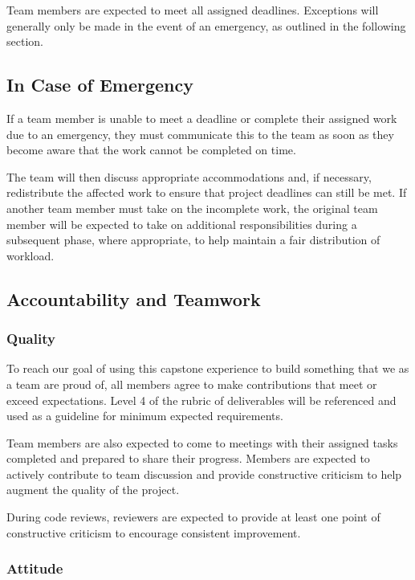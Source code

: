 \documentclass{article}
\begin{document}
Team members are expected to meet all assigned deadlines. Exceptions will generally only be made in the event of an emergency, as outlined in the following section.

\subsection*{In Case of Emergency}

If a team member is unable to meet a deadline or complete their assigned work due to an emergency, they must communicate this to the team as soon as they become aware that the work cannot be completed on time.

The team will then discuss appropriate accommodations and, if necessary, redistribute the affected work to ensure that project deadlines can still be met. If another team member must take on the incomplete work, the original team member will be expected to take on additional responsibilities during a subsequent phase, where appropriate, to help maintain a fair distribution of workload.

\subsection*{Accountability and Teamwork}

\subsubsection*{Quality} 

To reach our goal of using this capstone experience to build something that we as a team are proud of, all members agree to make contributions that meet or exceed expectations. Level 4 of the rubric of deliverables will be referenced and used as a guideline for minimum expected requirements.

Team members are also expected to come to meetings with their assigned tasks completed and prepared to share their progress. Members are expected to actively contribute to team discussion and provide constructive criticism to help augment the quality of the project.

During code reviews, reviewers are expected to provide at least one point of constructive criticism to encourage consistent improvement.

\subsubsection*{Attitude}
\end{document}
